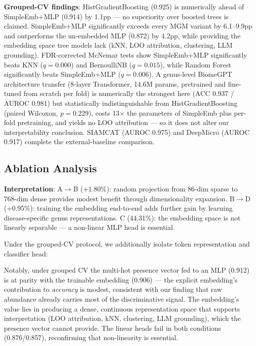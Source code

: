 \documentclass{article} %
\begin{document}
\textbf{Grouped-CV findings}: HistGradientBoosting (0.925) is numerically ahead of SimpleEmb+MLP (0.914) by 1.1pp --- no superiority over boosted trees is claimed. SimpleEmb+MLP significantly exceeds every MGM variant by 6.1--9.9pp and outperforms the un-embedded MLP (0.872) by 4.2pp, while providing the embedding space tree models lack (kNN, LOO attribution, clustering, LLM grounding). FDR-corrected McNemar tests show SimpleEmb+MLP significantly beats KNN ($q{=}0.000$) and BernoulliNB ($q{=}0.015$), while Random Forest significantly beats SimpleEmb+MLP ($q{=}0.006$). A genus-level BiomeGPT architecture transfer (8-layer Transformer, 14.6M params, pretrained and fine-tuned from scratch per fold) is numerically the strongest here (ACC 0.937 / AUROC 0.981) but statistically indistinguishable from HistGradientBoosting (paired Wilcoxon, $p{=}0.229$), costs 13$\times$ the parameters of SimpleEmb plus per-fold pretraining, and yields no LOO attribution --- so it does not alter our interpretability conclusion. SIAMCAT (AUROC 0.975) and DeepMicro (AUROC 0.917) complete the external-baseline comparison.



\subsection{Ablation Analysis}



\textbf{Interpretation}: A$\rightarrow$B (+1.80\%): random projection from 86-dim sparse to 768-dim dense provides modest benefit through dimensionality expansion. B$\rightarrow$D (+0.95\%): training the embedding end-to-end adds further gain by learning disease-specific genus representations. C (44.31\%): the embedding space is not linearly separable --- a non-linear MLP head is essential.

Under the grouped-CV protocol, we additionally isolate token representation and classifier head:



Notably, under grouped CV the multi-hot presence vector fed to an MLP (0.912) is at parity with the trainable embedding (0.906) --- the explicit embedding's contribution to \emph{accuracy} is modest, consistent with our finding that raw abundance already carries most of the discriminative signal. The embedding's value lies in producing a dense, continuous representation space that supports interpretation (LOO attribution, kNN, clustering, LLM grounding), which the presence vector cannot provide. The linear heads fail in both conditions (0.876/0.857), reconfirming that non-linearity is essential.
\end{document}
